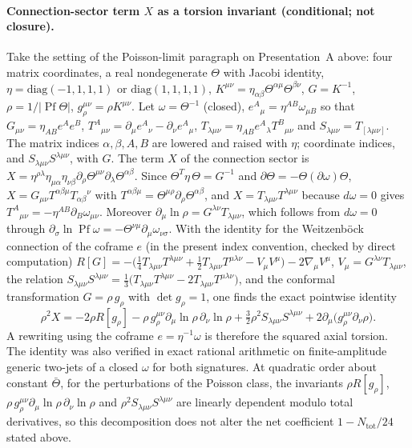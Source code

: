 \paragraph{Connection-sector term \(X\) as a torsion invariant (conditional; not closure).}
Take the setting of the Poisson-limit paragraph on Presentation~A above: four matrix coordinates, a real nondegenerate \(\Theta\) with Jacobi identity, \(\eta=\mathrm{diag}(-1,1,1,1)\) or \(\mathrm{diag}(1,1,1,1)\), \(K^{\mu\nu}=\eta_{\alpha\beta}\Theta^{\alpha\mu}\Theta^{\beta\nu}\), \(G=K^{-1}\), \(\rho=1/|\operatorname{Pf}\Theta|\), \(g_\rho^{\mu\nu}=\rho K^{\mu\nu}\). Let \(\omega=\Theta^{-1}\) (closed), \(e^A{}_\mu=\eta^{AB}\omega_{\mu B}\) so that \(G_{\mu\nu}=\eta_{AB}e^Ae^B\), \(T^{A}{}_{\mu\nu}=\partial_\mu e^A{}_\nu-\partial_\nu e^A{}_\mu\), \(T_{\lambda\mu\nu}=\eta_{AB}e^A{}_\lambda T^B{}_{\mu\nu}\) and \(S_{\lambda\mu\nu}=T_{[\lambda\mu\nu]}\). The matrix indices \(\alpha,\beta,A,B\) are lowered and raised with \(\eta\); coordinate indices, and \(S_{\lambda\mu\nu}S^{\lambda\mu\nu}\), with \(G\). The term \(X\) of the connection sector is \(X=\eta^{\rho\lambda}\eta_{\mu\alpha}\eta_{\nu\beta}\partial_\rho\Theta^{\mu\nu}\partial_\lambda\Theta^{\alpha\beta}\). Since \(\Theta^{T}\eta\,\Theta=G^{-1}\) and \(\partial\Theta=-\Theta(\partial\omega)\Theta\), \(X=G_{\mu\nu}T^{\alpha\beta\mu}T_{\alpha\beta}{}^{\nu}\) with \(T^{\alpha\beta\mu}=\Theta^{\mu\rho}\partial_\rho\Theta^{\alpha\beta}\), and \(X=T_{\lambda\mu\nu}T^{\lambda\mu\nu}\) because \(d\omega=0\) gives \(T^A{}_{\mu\nu}=-\eta^{AB}\partial_B\omega_{\mu\nu}\). Moreover \(\partial_\mu\ln\rho=G^{\lambda\nu}T_{\lambda\mu\nu}\), which follows from \(d\omega=0\) through \(\partial_\sigma\ln\operatorname{Pf}\omega=-\Theta^{\nu\mu}\partial_\mu\omega_{\nu\sigma}\). With the identity for the Weitzenb\"ock connection of the coframe \(e\) (in the present index convention, checked by direct computation) \(R[G]=-\bigl(\tfrac14T_{\lambda\mu\nu}T^{\lambda\mu\nu}+\tfrac12T_{\lambda\mu\nu}T^{\mu\lambda\nu}-V_\mu V^\mu\bigr)-2\nabla_\mu V^\mu\), \(V_\mu=G^{\lambda\nu}T_{\lambda\mu\nu}\), the relation \(S_{\lambda\mu\nu}S^{\lambda\mu\nu}=\tfrac13\bigl(T_{\lambda\mu\nu}T^{\lambda\mu\nu}-2T_{\lambda\mu\nu}T^{\mu\lambda\nu}\bigr)\), and the conformal transformation \(G=\rho\,g_\rho\) with \(\det g_\rho=1\), one finds the exact pointwise identity
\[
  \rho^2X=-2\rho R[g_\rho]-\rho\,g_\rho^{\mu\nu}\partial_\mu\ln\rho\,\partial_\nu\ln\rho+\tfrac32\rho^2S_{\lambda\mu\nu}S^{\lambda\mu\nu}+2\partial_\mu\bigl(g_\rho^{\mu\nu}\partial_\nu\rho\bigr).
\]
A rewriting using the coframe \(e=\eta^{-1}\omega\) is therefore the squared axial torsion. The identity was also verified in exact rational arithmetic on finite-amplitude generic two-jets of a closed \(\omega\) for both signatures. At quadratic order about constant \(\bar\Theta\), for the perturbations of the Poisson class, the invariants \(\rho R[g_\rho]\), \(\rho\,g_\rho^{\mu\nu}\partial_\mu\ln\rho\,\partial_\nu\ln\rho\) and \(\rho^2S_{\lambda\mu\nu}S^{\lambda\mu\nu}\) are linearly dependent modulo total derivatives, so this decomposition does not alter the net coefficient \(1-N_{\mathrm{tot}}/24\) stated above.

